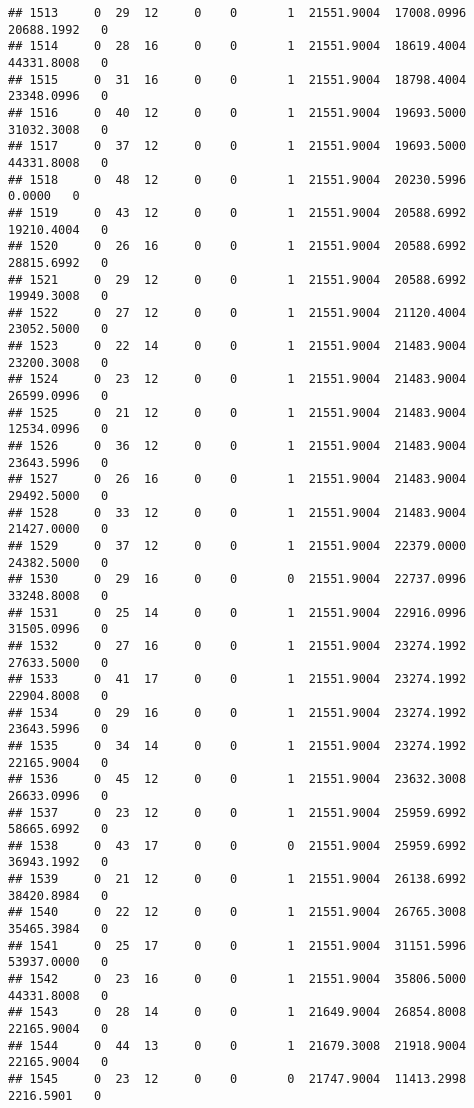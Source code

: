\documentclass[
]{article}
\begin{document}
\begin{enumerate}
\begin{verbatim}
## 1513     0  29  12     0    0       1  21551.9004  17008.0996  20688.1992   0
## 1514     0  28  16     0    0       1  21551.9004  18619.4004  44331.8008   0
## 1515     0  31  16     0    0       1  21551.9004  18798.4004  23348.0996   0
## 1516     0  40  12     0    0       1  21551.9004  19693.5000  31032.3008   0
## 1517     0  37  12     0    0       1  21551.9004  19693.5000  44331.8008   0
## 1518     0  48  12     0    0       1  21551.9004  20230.5996      0.0000   0
## 1519     0  43  12     0    0       1  21551.9004  20588.6992  19210.4004   0
## 1520     0  26  16     0    0       1  21551.9004  20588.6992  28815.6992   0
## 1521     0  29  12     0    0       1  21551.9004  20588.6992  19949.3008   0
## 1522     0  27  12     0    0       1  21551.9004  21120.4004  23052.5000   0
## 1523     0  22  14     0    0       1  21551.9004  21483.9004  23200.3008   0
## 1524     0  23  12     0    0       1  21551.9004  21483.9004  26599.0996   0
## 1525     0  21  12     0    0       1  21551.9004  21483.9004  12534.0996   0
## 1526     0  36  12     0    0       1  21551.9004  21483.9004  23643.5996   0
## 1527     0  26  16     0    0       1  21551.9004  21483.9004  29492.5000   0
## 1528     0  33  12     0    0       1  21551.9004  21483.9004  21427.0000   0
## 1529     0  37  12     0    0       1  21551.9004  22379.0000  24382.5000   0
## 1530     0  29  16     0    0       0  21551.9004  22737.0996  33248.8008   0
## 1531     0  25  14     0    0       1  21551.9004  22916.0996  31505.0996   0
## 1532     0  27  16     0    0       1  21551.9004  23274.1992  27633.5000   0
## 1533     0  41  17     0    0       1  21551.9004  23274.1992  22904.8008   0
## 1534     0  29  16     0    0       1  21551.9004  23274.1992  23643.5996   0
## 1535     0  34  14     0    0       1  21551.9004  23274.1992  22165.9004   0
## 1536     0  45  12     0    0       1  21551.9004  23632.3008  26633.0996   0
## 1537     0  23  12     0    0       1  21551.9004  25959.6992  58665.6992   0
## 1538     0  43  17     0    0       0  21551.9004  25959.6992  36943.1992   0
## 1539     0  21  12     0    0       1  21551.9004  26138.6992  38420.8984   0
## 1540     0  22  12     0    0       1  21551.9004  26765.3008  35465.3984   0
## 1541     0  25  17     0    0       1  21551.9004  31151.5996  53937.0000   0
## 1542     0  23  16     0    0       1  21551.9004  35806.5000  44331.8008   0
## 1543     0  28  14     0    0       1  21649.9004  26854.8008  22165.9004   0
## 1544     0  44  13     0    0       1  21679.3008  21918.9004  22165.9004   0
## 1545     0  23  12     0    0       0  21747.9004  11413.2998   2216.5901   0

\end{verbatim}
\end{enumerate}
\end{document}
